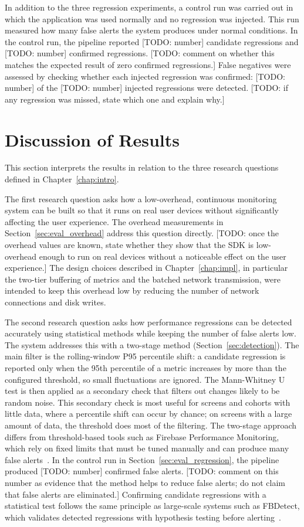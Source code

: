 In addition to the three regression experiments, a control run was carried out in which the application was used normally and no regression was injected. This run measured how many false alerts the system produces under normal conditions. In the control run, the pipeline reported [TODO: number] candidate regressions and [TODO: number] confirmed regressions. [TODO: comment on whether this matches the expected result of zero confirmed regressions.] False negatives were assessed by checking whether each injected regression was confirmed: [TODO: number] of the [TODO: number] injected regressions were detected. [TODO: if any regression was missed, state which one and explain why.]

\section{Discussion of Results}
\label{sec:eval_discussion}

This section interprets the results in relation to the three research questions defined in Chapter~\ref{chap:intro}.

The first research question asks how a low-overhead, continuous monitoring system can be built so that it runs on real user devices without significantly affecting the user experience. The overhead measurements in Section~\ref{sec:eval_overhead} address this question directly. [TODO: once the overhead values are known, state whether they show that the SDK is low-overhead enough to run on real devices without a noticeable effect on the user experience.] The design choices described in Chapter~\ref{chap:impl}, in particular the two-tier buffering of metrics and the batched network transmission, were intended to keep this overhead low by reducing the number of network connections and disk writes.

The second research question asks how performance regressions can be detected accurately using statistical methods while keeping the number of false alerts low. The system addresses this with a two-stage method (Section~\ref{sec:detection}). The main filter is the rolling-window P95 percentile shift: a candidate regression is reported only when the 95th percentile of a metric increases by more than the configured threshold, so small fluctuations are ignored. The Mann-Whitney U test is then applied as a secondary check that filters out changes likely to be random noise. This secondary check is most useful for screens and cohorts with little data, where a percentile shift can occur by chance; on screens with a large amount of data, the threshold does most of the filtering. The two-stage approach differs from threshold-based tools such as Firebase Performance Monitoring, which rely on fixed limits that must be tuned manually and can produce many false alerts~\cite{FirebasePerf}. In the control run in Section~\ref{sec:eval_regression}, the pipeline produced [TODO: number] confirmed false alerts. [TODO: comment on this number as evidence that the method helps to reduce false alerts; do not claim that false alerts are eliminated.] Confirming candidate regressions with a statistical test follows the same principle as large-scale systems such as FBDetect, which validates detected regressions with hypothesis testing before alerting~\cite{FBDetect}.

